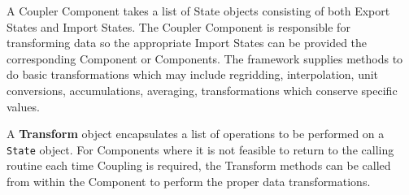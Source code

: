 A Coupler Component takes a list of State objects consisting of
both Export States and Import States.
The Coupler Component is responsible for transforming data 
so the appropriate Import States can be provided the corresponding
Component or Components.
The framework supplies
methods to do basic transformations which may include regridding,
interpolation, unit conversions, accumulations, averaging,
transformations which conserve specific values.


A {\bf Transform} object encapsulates a list of operations to be
performed on a {\tt State} object.  For Components where it is not
feasible to return to the calling routine each time Coupling is
required, the Transform methods can be called from within the
Component to perform the proper data transformations.

